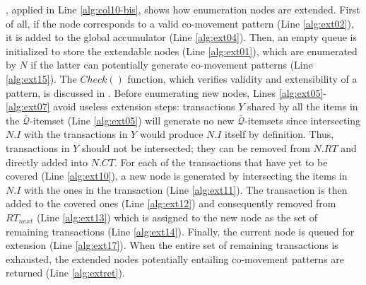 \documentclass[
]{ceurart}
\begin{document}
, applied in  Line \ref{alg:col10-bis}, shows how enumeration nodes are extended.
First of all, if the node corresponds to a valid co-movement pattern (Line \ref{alg:ext02}), it is added to the global accumulator (Line \ref{alg:ext04}).
Then, an empty queue is initialized to store the extendable nodes (Line \ref{alg:ext01}), which are enumerated by $N$ if the latter can potentially generate co-movement patterns (Line \ref{alg:ext15}).
The $Check()$ function, which verifies validity and extensibility of a pattern, is discussed in .
Before enumerating new nodes, Lines \ref{alg:ext05}-\ref{alg:ext07} avoid useless extension steps: transactions $Y$ shared by all the items in the $\bar{\mathcal{Q}}$-itemset (Line \ref{alg:ext05}) will generate no new $\bar{\mathcal{Q}}$-itemsets since intersecting $N.I$ with the transactions in $Y$ would produce $N.I$ itself by definition.
Thus, transactions in $Y$ should not be intersected; they can be removed from $N.RT$ and directly added into $N.CT$.
For each of the transactions that have yet to be covered (Line \ref{alg:ext10}), a new node is generated by intersecting the items in $N.I$ with the ones in the transaction (Line \ref{alg:ext11}).
The transaction is then added to the covered ones (Line \ref{alg:ext12}) and consequently removed from $RT_{next}$ (Line \ref{alg:ext13}) which is assigned to the new node as the set of remaining transactions (Line \ref{alg:ext14}).
Finally, the current node is queued for extension (Line \ref{alg:ext17}).
When the entire set of remaining transactions is exhausted, the extended nodes potentially entailing co-movement patterns are returned (Line \ref{alg:extret}).
\end{document}
